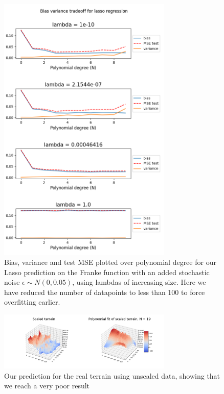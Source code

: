 \documentclass[twocolumn,10pt,cleanfoot]{asme2ej}
\begin{document}
\begin{figure}
\centerline{\includegraphics[width=3.25in]{figure/frankedifflambdaslasso.png}}
\caption{Bias, variance and test MSE plotted over polynomial degree for our Lasso prediction on the Franke function with an added stochastic noise $\epsilon \sim N(0,0.05)$, using lambdas of increasing size. Here we have reduced the number of datapoints to less than 100 to force overfitting earlier.}
\label{frankedifflambdaslasso}
\end{figure}





\begin{figure}
\centerline{\includegraphics[width=3.25in]{figure/realunscaled.png}}
\caption{Our prediction for the real terrain using unscaled data, showing that we reach a very poor result}
\label{realunscaled}
\end{figure}
\end{document}
